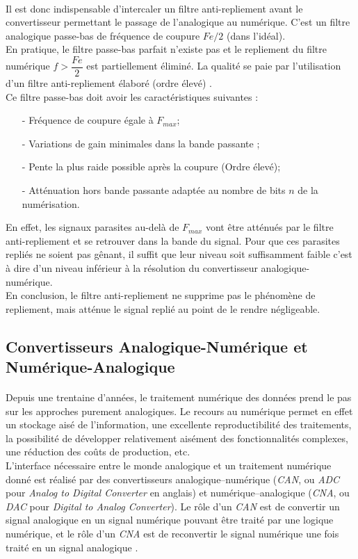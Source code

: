 \paragraph{}
Il est donc indispensable d'intercaler un filtre anti-repliement avant le convertisseur permettant le passage de l'analogique au numérique. C'est un filtre analogique passe-bas de fréquence de coupure $ Fe / 2 $ (dans l'idéal).\\
En pratique, le filtre passe-bas parfait n'existe pas et le repliement du filtre numérique $ f > \dfrac{Fe}{2}  $ est partiellement éliminé. La qualité se paie par l'utilisation d'un filtre anti-repliement élaboré (ordre élevé) \cite{20Filtr}.\\
Ce filtre passe-bas doit avoir les caractéristiques suivantes \cite{Ponge}:
\begin{itemize}
\item[-] Fréquence de coupure égale à $ F_{max} $;
\item[-] Variations de gain minimales dans la bande passante ;
\item[-] Pente la plus raide possible après la coupure (Ordre élevé);
\item[-] Atténuation hors bande passante adaptée au nombre de bits $ n $ de la numérisation.
\end{itemize}
En effet, les signaux parasites au-delà de $ F_{max} $ vont être atténués par le filtre anti-repliement et se retrouver dans la bande du signal. Pour que ces parasites repliés ne soient pas gênant, il suffit que leur niveau soit suffisamment faible c'est à dire d'un niveau inférieur à la résolution du convertisseur analogique-numérique.\\
En conclusion, le filtre anti-repliement ne supprime pas le phénomène de repliement, mais
atténue le signal replié au point de le rendre négligeable. 
\subsection{Convertisseurs Analogique-Numérique et Numérique-Analogique}
\paragraph{}
Depuis une trentaine d'années, le traitement numérique des données prend le pas sur les
approches purement analogiques. Le recours au numérique permet en effet un stockage aisé
de l'information, une excellente reproductibilité des traitements, la possibilité de développer
relativement aisément des fonctionnalités complexes, une réduction des coûts de production, etc.\\ 
L'interface nécessaire entre le monde analogique et un traitement numérique donné est réalisé
par des convertisseurs analogique–numérique (\emph{CAN}, ou \emph{ADC} pour \emph{Analog to Digital
Converter} en anglais) et numérique–analogique (\emph{CNA}, ou \emph{DAC} pour \emph{Digital to Analog
Converter}). Le rôle d'un \emph{CAN} est de convertir un signal analogique en un signal numérique
pouvant être traité par une logique numérique, et le rôle d'un \emph{CNA} est de reconvertir le signal
numérique une fois traité en un signal analogique \cite{CoursConv}.
